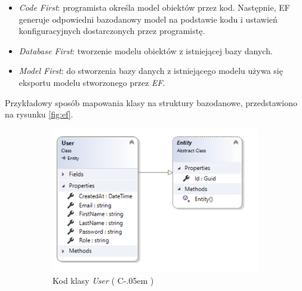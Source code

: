 \documentclass[12pt]{article}
\newcommand{\Csharp}{%
  {\settoheight{\dimen0}{C}C\kern-.05em \resizebox{!}{\dimen0}{\raisebox{\depth}{\# }}}}
\numberwithin{figure}{section}
\begin{document}
\begin{sloppypar}
\begin{itemize}
    \item \textit{Code First}: programista określa model obiektów przez kod. Następnie, EF generuje odpowiedni bazodanowy model na podstawie kodu i ustawień konfiguracyjnych dostarczonych przez programistę.
    \item \textit{Database First}: tworzenie modelu obiektów z istniejącej bazy danych.
    \item \textit{Model First}: do stworzenia bazy danych z istniejącego modelu używa się eksportu modelu stworzonego przez \textit{EF}.
\end{itemize}
    
Przykładowy sposób mapowania klasy na struktury bazodanowe, przedstawiono na rysunku \ref{fig:ef}.
    
\begin{figure}[H]
    \centering
    \begin{subfigure}{.6\textwidth}
      \centering
      \includegraphics[width=1\linewidth]{images/chapter_3/ef-code.png}
      \caption{Kod klasy \textit{User} (\Csharp)}
      \label{fig:ef-code}
    \end{subfigure}%
    \begin{subfigure}{.4\textwidth}
      \centering

\end{subfigure}
\end{figure}
\end{sloppypar}
\end{document}
